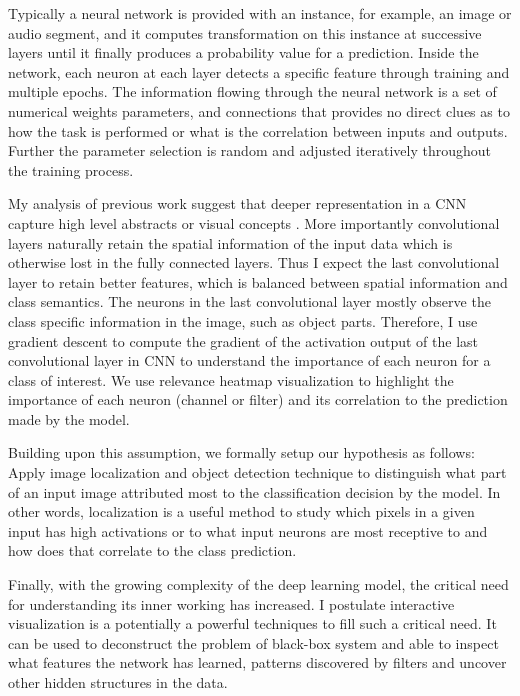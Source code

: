 Typically a neural network is provided with an instance, for example, an image or audio segment, and it computes transformation on this instance at successive layers until it finally produces a probability value for a prediction. Inside the network, each neuron at each layer detects a specific feature through training and multiple epochs. The information flowing through the neural network is a set of numerical weights parameters, and connections that provides no direct clues as to how the task is performed or what is the correlation between inputs and outputs. Further the parameter selection is random and adjusted iteratively throughout the training process.

My analysis of previous work suggest that deeper representation in a CNN capture high level abstracts or visual concepts \cite{Zeiler}. More importantly convolutional layers naturally retain the spatial information of the input data which is otherwise lost in the fully connected layers. Thus I expect the last convolutional layer to retain better features, which is balanced between spatial information and class semantics. The neurons in the last convolutional layer mostly observe the class specific information in the image, such as object parts. Therefore, I use gradient descent to compute the gradient of the activation output of the last convolutional layer in CNN to understand the importance of each neuron for a class of interest. We use relevance heatmap visualization to highlight the importance of each neuron (channel or filter) and its correlation to the prediction made by the model.

Building upon this assumption, we formally setup our hypothesis as follows: Apply image localization and object detection technique to distinguish what part of an input image attributed most to the classification decision by the model. In other words, localization is a useful method to study which pixels in a given input has high activations or to what input neurons are most receptive to and how does that correlate to the class prediction.

Finally, with the growing complexity of the deep learning model, the critical need for understanding its inner working has increased. I postulate interactive visualization is a potentially a powerful techniques to fill such a critical need. It can be used to deconstruct the problem of black-box system and able to inspect what features the network has learned, patterns discovered by filters and uncover other hidden structures in the data.

